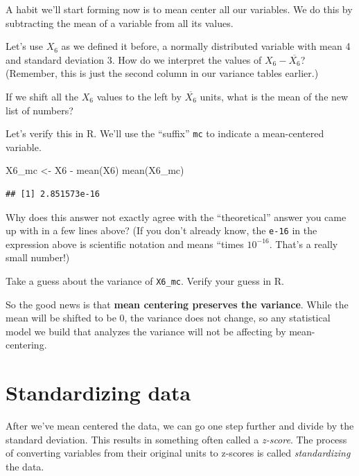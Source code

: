 \documentclass[
]{book}
\newenvironment{Shaded}{\begin{snugshade}}{\end{snugshade}}
\newcommand{\FunctionTok}[1]{\textcolor[rgb]{0.00,0.00,0.00}{#1}}
\newcommand{\NormalTok}[1]{#1}
\newcommand{\OtherTok}[1]{\textcolor[rgb]{0.56,0.35,0.01}{#1}}
\newcommand{\SpecialCharTok}[1]{\textcolor[rgb]{0.00,0.00,0.00}{#1}}
\begin{document}
A habit we'll start forming now is to mean center all our variables. We do this by subtracting the mean of a variable from all its values.

Let's use \(X_{6}\) as we defined it before, a normally distributed variable with mean 4 and standard deviation 3. How do we interpret the values of \(X_{6} - \overline{X_{6}}\)? (Remember, this is just the second column in our variance tables earlier.)

If we shift all the \(X_{6}\) values to the left by \(\overline{X_{6}}\) units, what is the mean of the new list of numbers?

Let's verify this in R. We'll use the ``suffix'' \texttt{mc} to indicate a mean-centered variable.

\begin{Shaded}
\begin{Highlighting}[]
\NormalTok{X6\_mc }\OtherTok{\textless{}{-}}\NormalTok{ X6 }\SpecialCharTok{{-}} \FunctionTok{mean}\NormalTok{(X6)}
\FunctionTok{mean}\NormalTok{(X6\_mc)}
\end{Highlighting}
\end{Shaded}

\begin{verbatim}
## [1] 2.851573e-16
\end{verbatim}

Why does this answer not exactly agree with the ``theoretical'' answer you came up with in a few lines above? (If you don't already know, the \texttt{e-16} in the expression above is scientific notation and means ``times \(10^{-16}\). That's a really small number!)

Take a guess about the variance of \texttt{X6\_mc}. Verify your guess in R.

So the good news is that \textbf{mean centering preserves the variance}. While the mean will be shifted to be 0, the variance does not change, so any statistical model we build that analyzes the variance will not be affecting by mean-centering.

\hypertarget{variance-standardizing}{%
\section{Standardizing data}\label{variance-standardizing}}

After we've mean centered the data, we can go one step further and divide by the standard deviation. This results in something often called a \emph{z-score}. The process of converting variables from their original units to z-scores is called \emph{standardizing} the data.
\end{document}
